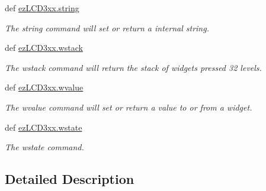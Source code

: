 \begin{DoxyCompactItemize}
def \hyperlink{group___widgets_ga606e61e5ba0ea6ae6ada021e7c021b39}{ez\-L\-C\-D3xx.\-string}
\begin{DoxyCompactList}\small\item\em The string command will set or return a internal string. \end{DoxyCompactList}\item 
def \hyperlink{group___widgets_ga70b40969e280a9c315b84c18848309ca}{ez\-L\-C\-D3xx.\-wstack}
\begin{DoxyCompactList}\small\item\em The wstack command will return the stack of widgets pressed 32 levels. \end{DoxyCompactList}\item 
def \hyperlink{group___widgets_ga7eaa2fac8abbadf04fa9afb49702906a}{ez\-L\-C\-D3xx.\-wvalue}
\begin{DoxyCompactList}\small\item\em The wvalue command will set or return a value to or from a widget. \end{DoxyCompactList}\item 
def \hyperlink{group___widgets_gaada0b335d54904b4f4517755ace97e47}{ez\-L\-C\-D3xx.\-wstate}
\begin{DoxyCompactList}\small\item\em The wstate command. \end{DoxyCompactList}\end{DoxyCompactItemize}


\subsection{Detailed Description}


